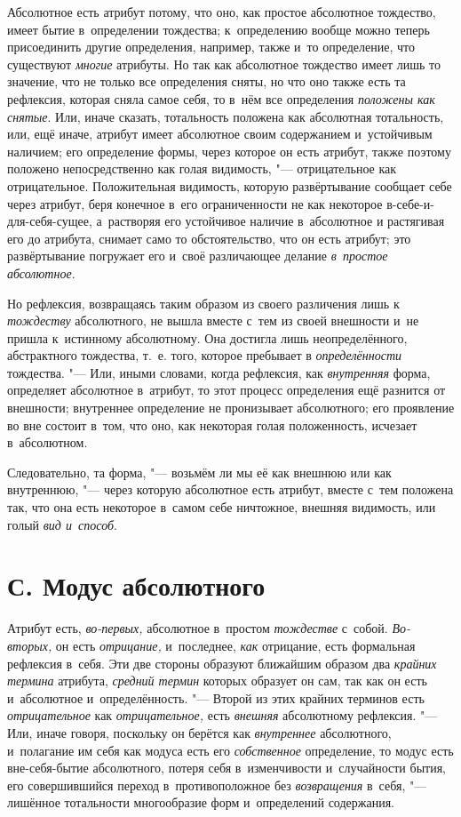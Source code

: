 Абсолютное есть атрибут потому, что оно, как простое абсолютное тождество,
имеет бытие в~определении тождества; к~определению вообще можно теперь
присоединить другие определения, например, также и~то определение, что
существуют {\em многие} атрибуты. Но так как абсолютное
тождество имеет лишь то значение, что не только все определения сняты, но
что оно также есть та рефлексия, которая сняла самое себя, то в~нём все
определения {\em положены как снятые}. Или, иначе
сказать, тотальность положена как абсолютная тотальность, или, ещё иначе,
атрибут имеет абсолютное своим содержанием и~устойчивым наличием; его
определение формы, через которое он есть атрибут, также поэтому положено
непосредственно как голая видимость, "--- отрицательное как отрицательное.
Положительная видимость, которую развёртывание сообщает себе через атрибут,
беря конечное в~его ограниченности не как некоторое
в-себе-и-для-себя-сущее, а~растворяя его устойчивое наличие в~абсолютное и
растягивая его до атрибута, снимает само то обстоятельство, что он есть
атрибут; это развёртывание погружает его и~своё различающее делание
{\em в~простое абсолютное}.

Но рефлексия, возвращаясь таким образом из своего различения лишь к
{\em тождеству} абсолютного, не вышла вместе с~тем из
своей внешности и~не пришла к~истинному абсолютному. Она достигла лишь
неопределённого, абстрактного тождества, т.~е. того, которое пребывает в
{\em определённости} тождества. "--- Или, иными словами,
когда рефлексия, как {\em внутренняя} форма, определяет
абсолютное в~атрибут, то этот процесс определения ещё разнится от
внешности; внутреннее определение не пронизывает абсолютного; его
проявление во вне состоит в~том, что оно, как некоторая голая положенность,
исчезает в~абсолютном.

Следовательно, та форма, "--- возьмём ли мы её как внешнюю или как внутреннюю,
"--- через которую абсолютное есть атрибут, вместе с~тем положена так, что она
есть некоторое в~самом себе ничтожное, внешняя видимость, или голый
{\em вид и~способ}.


\section[С. Модус абсолютного]{С. Модус абсолютного}

Атрибут есть, {\em во-первых,} абсолютное в~простом {\em тождестве} с~собой.
{\em Во-вторых,} он есть {\em отрицание,} и~последнее,
{\em как} отрицание, есть формальная рефлексия в~себя.
Эти две стороны образуют ближайшим образом два {\em крайних термина} атрибута,
{\em средний термин} которых образует он сам, так как
он есть и~абсолютное и~определённость. "--- Второй из этих крайних терминов
есть {\em отрицательное} как {\em отрицательное,} есть
{\em внешняя} абсолютному рефлексия. "--- Или, иначе
говоря, поскольку он берётся как {\em внутреннее}
абсолютного, и~полагание им себя как модуса есть его
{\em собственное} определение, то модус есть
вне-себя-бытие абсолютного, потеря себя в~изменчивости и~случайности бытия,
его совершившийся переход в~противоположное без
{\em возвращения} в~себя, "--- лишённое тотальности
многообразие форм и~определений содержания.

